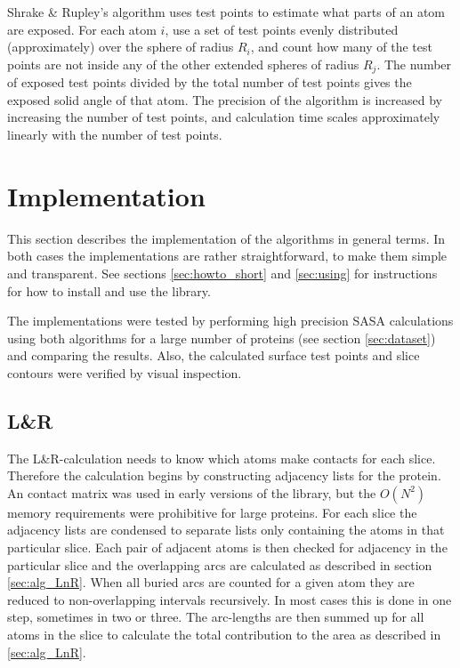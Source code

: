 \documentclass[a4paper,11pt]{article}
\begin{document}
Shrake \& Rupley's algorithm uses test points to estimate what parts
of an atom are exposed. For each atom $i$, use a set of test points
evenly distributed (approximately) over the sphere of radius $R_i$,
and count how many of the test points are not inside any of the other
extended spheres of radius $R_j$. The number of exposed test points
divided by the total number of test points gives the exposed solid
angle of that atom. The precision of the algorithm is increased by
increasing the number of test points, and calculation time scales
approximately linearly with the number of test points.


\section{Implementation}\label{sec:imp}

This section describes the implementation of the algorithms in general
terms. In both cases the implementations are rather straightforward,
to make them simple and transparent. See sections
\ref{sec:howto_short} and \ref{sec:using} for instructions for how to
install and use the library.

The implementations were tested by performing high precision SASA
calculations using both algorithms for a large number of proteins (see
section \ref{sec:dataset}) and comparing the results. Also, the
calculated surface test points and slice contours were verified by
visual inspection.


\subsection{L\&R}

The L\&R-calculation needs to know which atoms make contacts for each
slice. Therefore the calculation begins by constructing adjacency
lists for the protein. An contact matrix was used in early versions of
the library, but the $O(N^2)$ memory requirements were prohibitive for
large proteins. For each slice the adjacency lists are condensed to
separate lists only containing the atoms in that particular
slice. Each pair of adjacent atoms is then checked for adjacency in
the particular slice and the overlapping arcs are calculated as
described in section \ref{sec:alg_LnR}. When all buried arcs are
counted for a given atom they are reduced to non-overlapping intervals
recursively. In most cases this is done in one step, sometimes in two
or three. The arc-lengths are then summed up for all atoms in the
slice to calculate the total contribution to the area as described in
\ref{sec:alg_LnR}.
\end{document}

